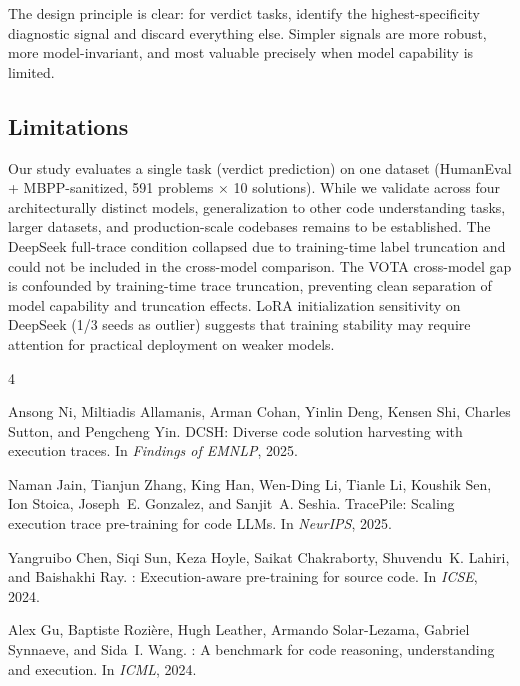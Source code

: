 \documentclass[11pt]{article}
\begin{document}
The design principle is clear: for verdict tasks, identify the highest-specificity diagnostic signal and discard everything else.
Simpler signals are more robust, more model-invariant, and most valuable precisely when model capability is limited.

\subsection*{Limitations}

Our study evaluates a single task (verdict prediction) on one dataset (HumanEval + MBPP-sanitized, 591 problems $\times$ 10 solutions).
While we validate across four architecturally distinct models, generalization to other code understanding tasks, larger datasets, and production-scale codebases remains to be established.
The DeepSeek full-trace condition collapsed due to training-time label truncation and could not be included in the cross-model comparison.
The VOTA cross-model gap is confounded by training-time trace truncation, preventing clean separation of model capability and truncation effects.
LoRA initialization sensitivity on DeepSeek (1/3 seeds as outlier) suggests that training stability may require attention for practical deployment on weaker models.

\begin{thebibliography}{4}

Ansong Ni, Miltiadis Allamanis, Arman Cohan, Yinlin Deng, Kensen Shi, Charles Sutton, and Pengcheng Yin.
\newblock DCSH: Diverse code solution harvesting with execution traces.
\newblock In \emph{Findings of EMNLP}, 2025.

Naman Jain, Tianjun Zhang, King Han, Wen-Ding Li, Tianle Li, Koushik Sen, Ion Stoica, Joseph~E. Gonzalez, and Sanjit~A. Seshia.
\newblock TracePile: Scaling execution trace pre-training for code {LLM}s.
\newblock In \emph{NeurIPS}, 2025.

Yangruibo Chen, Siqi Sun, Keza Hoyle, Saikat Chakraborty, Shuvendu~K. Lahiri, and Baishakhi Ray.
: Execution-aware pre-training for source code.
\newblock In \emph{ICSE}, 2024.

Alex Gu, Baptiste Rozi\`{e}re, Hugh Leather, Armando Solar-Lezama, Gabriel Synnaeve, and Sida~I. Wang.
: A benchmark for code reasoning, understanding and execution.
\newblock In \emph{ICML}, 2024.

\end{thebibliography}
\end{document}
